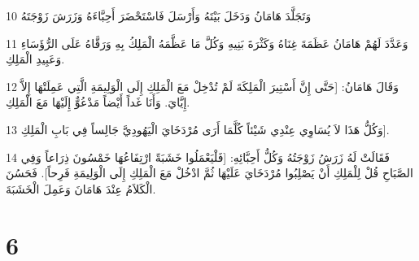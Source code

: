 \par 10 وَتَجَلَّدَ هَامَانُ وَدَخَلَ بَيْتَهُ وَأَرْسَلَ فَاسْتَحْضَرَ أَحِبَّاءَهُ وَزَرَشَ زَوْجَتَهُ
\par 11 وَعَدَّدَ لَهُمْ هَامَانُ عَظَمَةَ غِنَاهُ وَكَثْرَةَ بَنِيهِ وَكُلَّ مَا عَظَّمَهُ الْمَلِكُ بِهِ وَرَقَّاهُ عَلَى الرُّؤَسَاءِ وَعَبِيدِ الْمَلِكِ.
\par 12 وَقَالَ هَامَانُ: [حَتَّى إِنَّ أَسْتِيرَ الْمَلِكَةَ لَمْ تُدْخِلْ مَعَ الْمَلِكِ إِلَى الْوَلِيمَةِ الَّتِي عَمِلَتْهَا إِلاَّ إِيَّايَ. وَأَنَا غَداً أَيْضاً مَدْعُوٌّ إِلَيْهَا مَعَ الْمَلِكِ.
\par 13 وَكُلُّ هَذَا لاَ يُسَاوِي عِنْدِي شَيْئاً كُلَّمَا أَرَى مُرْدَخَايَ الْيَهُودِيَّ جَالِساً فِي بَابِ الْمَلِكِ].
\par 14 فَقَالَتْ لَهُ زَرَشُ زَوْجَتُهُ وَكُلُّ أَحِبَّائِهِ: [فَلْيَعْمَلُوا خَشَبَةً ارْتِفَاعُهَا خَمْسُونَ ذِرَاعاً وَفِي الصَّبَاحِ قُلْ لِلْمَلِكِ أَنْ يَصْلِبُوا مُرْدَخَايَ عَلَيْهَا ثُمَّ ادْخُلْ مَعَ الْمَلِكِ إِلَى الْوَلِيمَةِ فَرِحاً]. فَحَسُنَ الْكَلاَمُ عِنْدَ هَامَانَ وَعَمِلَ الْخَشَبَةَ.

\chapter{6}

